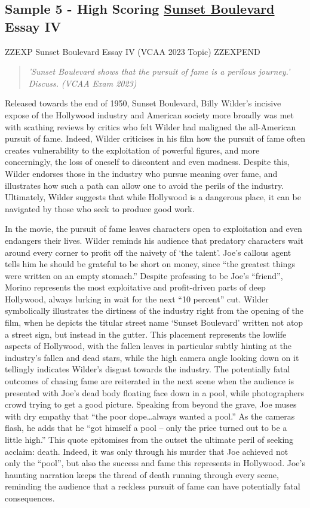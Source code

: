 \documentclass[a4paper]{article}
\begin{document}
\newpage

\subsection{Sample 5 - High Scoring \underline{Sunset Boulevard} Essay IV}


ZZEXP Sunset Boulevard Essay IV (VCAA 2023 Topic) ZZEXPEND


\begin{quote}
\textit{'Sunset Boulevard shows that the pursuit of fame is a perilous journey.' Discuss. (VCAA Exam 2023)}
\end{quote}

Released towards the end of 1950, Sunset Boulevard, Billy Wilder’s incisive expose of the Hollywood industry and American society more broadly was met with scathing reviews by critics who felt Wilder had maligned the all-American pursuit of fame. Indeed, Wilder criticises in his film how the pursuit of fame often creates vulnerability to the exploitation of powerful figures, and more concerningly, the loss of oneself to discontent and even madness. Despite this, Wilder endorses those in the industry who pursue meaning over fame, and illustrates how such a path can allow one to avoid the perils of the industry. Ultimately, Wilder suggests that while Hollywood is a dangerous place, it can be navigated by those who seek to produce good work.

In the movie, the pursuit of fame leaves characters open to exploitation and even endangers their lives. Wilder reminds his audience that predatory characters wait around every corner to profit off the naivety of ‘the talent’. Joe’s callous agent tells him he should be grateful to be short on money, since “the greatest things were written on an empty stomach.” Despite professing to be Joe’s “friend”, Morino represents the most exploitative and profit-driven parts of deep Hollywood, always lurking in wait for the next “10 percent” cut. Wilder symbolically illustrates the dirtiness of the industry right from the opening of the film, when he depicts the titular street name ‘Sunset Boulevard’ written not atop a street sign, but instead in the gutter. This placement represents the lowlife aspects of Hollywood, with the fallen leaves in particular subtly hinting at the industry’s fallen and dead stars, while the high camera angle looking down on it tellingly indicates Wilder’s disgust towards the industry. The potentially fatal outcomes of chasing fame are reiterated in the next scene when the audience is presented with Joe’s dead body floating face down in a pool, while photographers crowd trying to get a good picture. Speaking from beyond the grave, Joe muses with dry empathy that “the poor dope…always wanted a pool.” As the cameras flash, he adds that he “got himself a pool – only the price turned out to be a little high.” This quote epitomises from the outset the ultimate peril of seeking acclaim: death. Indeed, it was only through his murder that Joe achieved not only the “pool”, but also the success and fame this represents in Hollywood. Joe’s haunting narration keeps the thread of death running through every scene, reminding the audience that a reckless pursuit of fame can have potentially fatal consequences.
\end{document}
